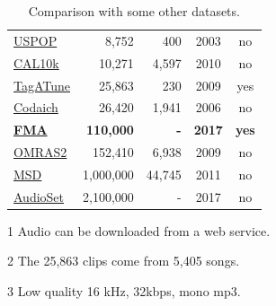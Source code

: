 \documentclass{article}
\begin{document}
\begin{table}
\begin{threeparttable}
\begin{tabular}{lrrcc}
		\href{https://labrosa.ee.columbia.edu/projects/musicsim/uspop2002.html}{USPOP} \cite{uspop} & 8,752 & 400 & 2003 & no \\
		\href{http://calab1.ucsd.edu/~datasets/cal10k/}{CAL10k} \cite{cal10k} & 10,271 & 4,597 & 2010 & no \\ %
		\href{http://mirg.city.ac.uk/codeapps/the-magnatagatune-dataset}{TagATune} \cite{magnatagatune} & 25,863\tnote{2} & 230 & 2009 & yes\tnote{3} \\ %
		\href{http://jmir.sourceforge.net/index_Codaich.html}{Codaich} \cite{codaich} & 26,420 & 1,941 & 2006 & no \\ %
		\bf \href{https://github.com/mdeff/fma/}{FMA} & \bf 110,000 & \bf - & \bf 2017 & \bf yes \\
		\href{http://www.omras2.org/}{OMRAS2} \cite{omras} & 152,410 & 6,938 & 2009 & no \\
		\href{https://labrosa.ee.columbia.edu/millionsong/}{MSD} \cite{msd} & 1,000,000 & 44,745 & 2011 & no\tnote{1} \\
		\href{https://research.google.com/audioset/}{AudioSet} \cite{audioset} & 2,100,000 & - & 2017 & no\tnote{1} \\
		\bottomrule
	\end{tabular}
	\begin{tablenotes}
		\item[1] Audio can be downloaded from a web service. %
		\item[2] The 25,863 clips come from 5,405 songs.
		\item[3] Low quality 16 kHz, 32kbps, mono mp3.
	\end{tablenotes}
	\end{threeparttable}
	\caption{Comparison with some other datasets.}
	\label{tab:datasets}
\end{table}


\end{document}

